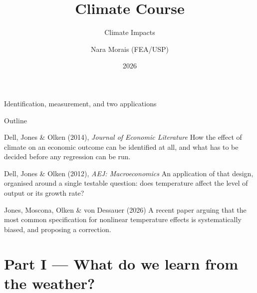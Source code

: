 \documentclass[aspectratio=169,10pt]{beamer}
\title{Climate Course}
\subtitle{Climate Impacts}
\author{Nara Morais (FEA/USP)}
\institute{FEA/USP}
\date{2026}
\begin{document}
           {Identification, measurement, and two applications}

\begin{frame}{Outline}
  \vfill
  \begin{block}{Dell, Jones \& Olken (2014), \emph{Journal of Economic Literature}}
    \small How the effect of climate on an economic outcome can be identified at
    all, and what has to be decided before any regression can be run.
  \end{block}
  \vspace{2pt}
  \begin{block}{Dell, Jones \& Olken (2012), \emph{AEJ: Macroeconomics}}
    \small An application of that design, organised around a single testable
    question: does temperature affect the level of output or its growth rate?
  \end{block}
  \vspace{2pt}
  \begin{block}{Jones, Moscona, Olken \& von Dessauer (2026)}
    \small A recent paper arguing that the most common specification for
    nonlinear temperature effects is systematically biased, and proposing a
    correction.
  \end{block}
  \vfill
\end{frame}

\section{Part I — What do we learn from the weather?}
\end{document}
